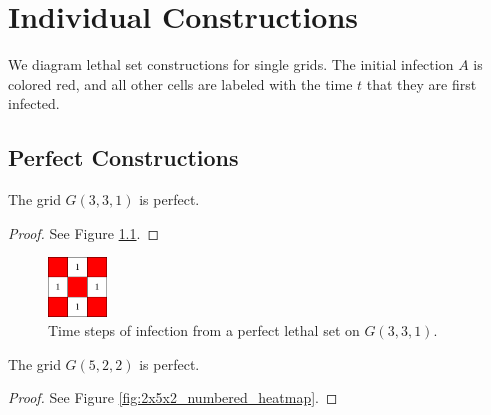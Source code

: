 \appendix
\chapter{Individual Constructions}

We diagram lethal set constructions for single grids. The initial infection $A$ is colored red, and all other cells are labeled with the time $t$ that they are first infected. 

\section{Perfect Constructions}

\begin{con}
\label{con:3x3x1}
The grid $G(3,3,1)$ is perfect.
\end{con}

\begin{proof}
See Figure \ref{fig:3x3x1_numbered_heatmap}.
\end{proof}

\begin{figure}[H]
\centering
\includegraphics[width=0.14\textwidth]{figures/A/3x3x1_numbered_heatmap.pdf}
\caption{Time steps of infection from a perfect lethal set on $G(3,3,1)$.}
\label{fig:3x3x1_numbered_heatmap}
\end{figure}




\begin{con}
\label{con:5x2x2}
The grid $G(5,2,2)$ is perfect.
\end{con}

\begin{proof}
See Figure \ref{fig:2x5x2_numbered_heatmap}.
\end{proof}

